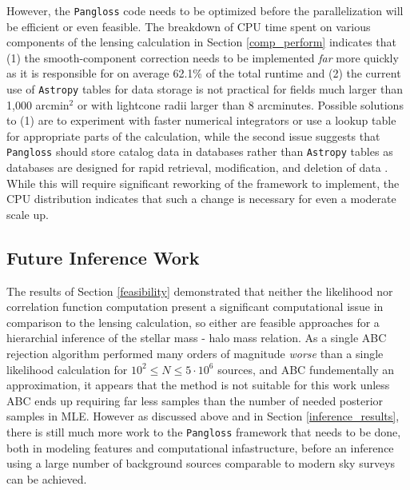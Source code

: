 \documentclass[%
 reprint,
 amsmath,amssymb,
 aps,nofootinbib
]{revtex4-1}
\begin{document}
However, the \texttt{Pangloss} code needs to be optimized before the parallelization will be efficient or even feasible. The breakdown of CPU time spent on various components of the lensing calculation in Section \ref{comp_perform} indicates that (1) the smooth-component correction needs to be implemented \textit{far} more quickly as it is responsible for on average 62.1\% of the total runtime and (2) the current use of \texttt{Astropy} tables for data storage is not practical for fields much larger than 1,000 arcmin$^2$ or with lightcone radii larger than 8 arcminutes. Possible solutions to (1) are to experiment with faster numerical integrators or use a lookup table for appropriate parts of the calculation, while the second issue suggests that \texttt{Pangloss} should store catalog data in databases rather than \texttt{Astropy} tables as databases are designed for rapid retrieval, modification, and deletion of data \cite{databases}. While this will require significant reworking of the framework to implement, the CPU distribution indicates that such a change is necessary for even a moderate scale up.

\subsection{Future Inference Work}

The results of Section \ref{feasibility} demonstrated that neither the likelihood nor correlation function computation present a significant computational issue in comparison to the lensing calculation, so either are feasible approaches for a hierarchial inference of the stellar mass - halo mass relation. As a single ABC rejection algorithm performed many orders of magnitude \textit{worse} than a single likelihood calculation for ${10^2\leq N\leq5\cdot10^6}$ sources, and ABC fundementally an approximation, it appears that the method is not suitable for this work unless ABC ends up requiring far less samples than the number of needed posterior samples in MLE. However as discussed above and in Section \ref{inference_results}, there is still much more work to the \texttt{Pangloss} framework that needs to be done, both in modeling features and computational infastructure, before an inference using a large number of background sources comparable to modern sky surveys can be achieved.


\end{document}
